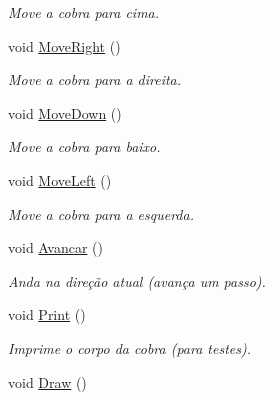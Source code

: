 \begin{DoxyCompactItemize}
\begin{DoxyCompactList}\small\item\em Move a cobra para cima. \end{DoxyCompactList}\item 
\hypertarget{class_snake_a2808eaaa1936957abfe69208b3efb176}{}void \hyperlink{class_snake_a2808eaaa1936957abfe69208b3efb176}{Move\+Right} ()\label{class_snake_a2808eaaa1936957abfe69208b3efb176}

\begin{DoxyCompactList}\small\item\em Move a cobra para a direita. \end{DoxyCompactList}\item 
\hypertarget{class_snake_a69c8dbac2686f17234c7760a81cec33a}{}void \hyperlink{class_snake_a69c8dbac2686f17234c7760a81cec33a}{Move\+Down} ()\label{class_snake_a69c8dbac2686f17234c7760a81cec33a}

\begin{DoxyCompactList}\small\item\em Move a cobra para baixo. \end{DoxyCompactList}\item 
\hypertarget{class_snake_a5f794285b1ca4fc10408d6fdde4afe45}{}void \hyperlink{class_snake_a5f794285b1ca4fc10408d6fdde4afe45}{Move\+Left} ()\label{class_snake_a5f794285b1ca4fc10408d6fdde4afe45}

\begin{DoxyCompactList}\small\item\em Move a cobra para a esquerda. \end{DoxyCompactList}\item 
\hypertarget{class_snake_acfad0d1bf04e00604b3946c3da3aa2c3}{}void \hyperlink{class_snake_acfad0d1bf04e00604b3946c3da3aa2c3}{Avancar} ()\label{class_snake_acfad0d1bf04e00604b3946c3da3aa2c3}

\begin{DoxyCompactList}\small\item\em Anda na direção atual (avança um passo). \end{DoxyCompactList}\item 
\hypertarget{class_snake_aa2f5f275ece2a1876e95cf6ff12f176a}{}void \hyperlink{class_snake_aa2f5f275ece2a1876e95cf6ff12f176a}{Print} ()\label{class_snake_aa2f5f275ece2a1876e95cf6ff12f176a}

\begin{DoxyCompactList}\small\item\em Imprime o corpo da cobra (para testes). \end{DoxyCompactList}\item 
\hypertarget{class_snake_a819c70fc5ed3dbb1b31eca548f659e8b}{}void \hyperlink{class_snake_a819c70fc5ed3dbb1b31eca548f659e8b}{Draw} ()\label{class_snake_a819c70fc5ed3dbb1b31eca548f659e8b}


\end{DoxyCompactItemize}
